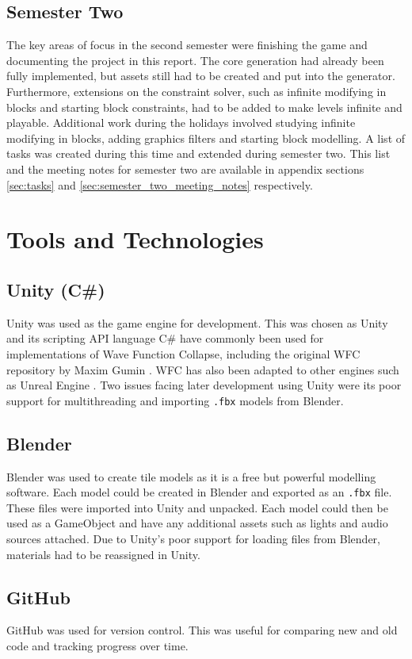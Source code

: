 \subsection{Semester Two}
The key areas of focus in the second semester were finishing the game and documenting the project in this report. The core generation had already been fully implemented, but assets still had to be created and put into the generator. Furthermore, extensions on the constraint solver, such as infinite modifying in blocks and starting block constraints, had to be added to make levels infinite and playable. Additional work during the holidays involved studying infinite modifying in blocks, adding graphics filters and starting block modelling. A list of tasks was created during this time and extended during semester two. This list and the meeting notes for semester two are available in appendix sections \ref{sec:tasks} and \ref{sec:semester_two_meeting_notes} respectively.

\section{Tools and Technologies}
\subsection{Unity (C\#)}
Unity was used as the game engine for development. This was chosen as Unity and its scripting API language C\# have commonly been used for implementations of Wave Function Collapse, including the original WFC repository by Maxim Gumin \cite{Gumin_Wave_Function_Collapse_2016}. WFC has also been adapted to other engines such as Unreal Engine \cite{unreal_engine_WFC}. Two issues facing later development using Unity were its poor support for multithreading and importing \texttt{.fbx} models from Blender.

\subsection{Blender}
Blender was used to create tile models as it is a free but powerful modelling software. Each model could be created in Blender and exported as an \texttt{.fbx} file. These files were imported into Unity and unpacked. Each model could then be used as a GameObject and have any additional assets such as lights and audio sources attached. Due to Unity's poor support for loading files from Blender, materials had to be reassigned in Unity.

\subsection{GitHub}
GitHub was used for version control. This was useful for comparing new and old code and tracking progress over time.

